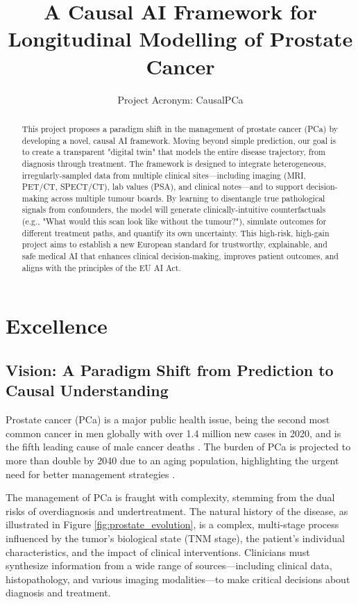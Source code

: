 \documentclass[11pt, a4paper]{article}
\title{A Causal AI Framework for Longitudinal Modelling of Prostate Cancer}
\author{Project Acronym: CausalPCa}
\date{}
\begin{document}
\maketitle

\begin{abstract}
This project proposes a paradigm shift in the management of prostate cancer (PCa) by developing a novel, causal AI framework. Moving beyond simple prediction, our goal is to create a transparent "digital twin" that models the entire disease trajectory, from diagnosis through treatment. The framework is designed to integrate heterogeneous, irregularly-sampled data from multiple clinical sites—including imaging (MRI, PET/CT, SPECT/CT), lab values (PSA), and clinical notes—and to support decision-making across multiple tumour boards. By learning to disentangle true pathological signals from confounders, the model will generate clinically-intuitive counterfactuals (e.g., "What would this scan look like without the tumour?"), simulate outcomes for different treatment paths, and quantify its own uncertainty. This high-risk, high-gain project aims to establish a new European standard for trustworthy, explainable, and safe medical AI that enhances clinical decision-making, improves patient outcomes, and aligns with the principles of the EU AI Act.
\end{abstract}

\section{Excellence}

\subsection{Vision: A Paradigm Shift from Prediction to Causal Understanding}
Prostate cancer (PCa) is a major public health issue, being the second most common cancer in men globally with over 1.4 million new cases in 2020, and is the fifth leading cause of male cancer deaths \cite{CaraccioloCastello2024,DulleaOSullivan2025,CereserEvangelista2023,GammelSolari2024,DharCendejasGomez2024}. The burden of PCa is projected to more than double by 2040 due to an aging population, highlighting the urgent need for better management strategies \cite{UdovicichJia2025,SungFerlay2021}.

The management of PCa is fraught with complexity, stemming from the dual risks of overdiagnosis and undertreatment. The natural history of the disease, as illustrated in Figure \ref{fig:prostate_evolution}, is a complex, multi-stage process influenced by the tumor's biological state (TNM stage), the patient's individual characteristics, and the impact of clinical interventions. Clinicians must synthesize information from a wide range of sources—including clinical data, histopathology, and various imaging modalities—to make critical decisions about diagnosis and treatment.
\end{document}
